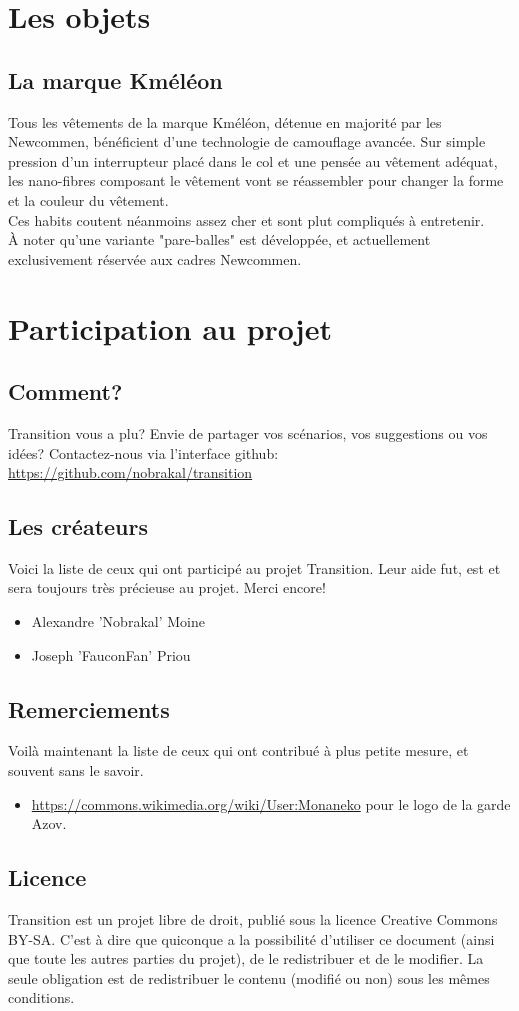 \documentclass{book}
\begin{document}
\section{Les objets}
\subsection{La marque Kméléon}
Tous les vêtements de la marque Kméléon, détenue en majorité par les Newcommen, bénéficient d'une technologie de camouflage avancée. Sur simple pression d'un interrupteur placé dans le col et une pensée au vêtement adéquat, les nano-fibres composant le vêtement vont se réassembler pour changer la forme et la couleur du vêtement.\\
Ces habits coutent néanmoins assez cher et sont plut compliqués à entretenir.\\
À noter qu'une variante "pare-balles" est développée, et actuellement exclusivement réservée aux cadres Newcommen. 

\newpage
\section{Participation au projet}
\subsection{Comment?}
\hypertarget{participation}{}
Transition vous a plu? 
Envie de partager vos scénarios, vos suggestions ou vos idées?
\newline
Contactez-nous via l'interface github: \href {https://github.com/nobrakal/transition} {https://github.com/nobrakal/transition}
\subsection{Les créateurs}
Voici la liste de ceux qui ont participé au projet Transition. Leur aide fut, est et sera toujours très précieuse au projet. Merci encore!  
\begin{itemize}
\item Alexandre ’Nobrakal’ Moine 
\item Joseph ’FauconFan’ Priou
\end{itemize}
\subsection{Remerciements}
Voilà maintenant la liste de ceux qui ont contribué à plus petite mesure, et souvent sans le savoir. 
\begin{itemize}
	\item \url{https://commons.wikimedia.org/wiki/User:Monaneko} pour le logo de la garde Azov.
\end{itemize}
\subsection{Licence}
Transition est un projet libre de droit, publié sous la licence Creative Commons BY-SA. C'est à dire que quiconque a la possibilité d'utiliser ce document (ainsi que toute les autres parties du projet), de le redistribuer et de le modifier. La seule obligation est de redistribuer le contenu (modifié ou non) sous les mêmes conditions.
\end{document}
